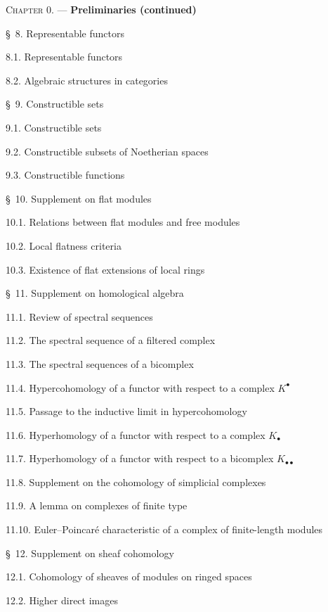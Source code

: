 \documentclass[oneside]{amsart}
\theoremstyle{ega-env-style}
\theoremstyle{ega-thm-env-style}
\theoremstyle{ega-defn-env-style}
\begin{document}
\begin{flushleft}
\textsc{Chapter 0.} --- \textbf{Preliminaries (continued)} 

\medskip
\S~8. Representable functors 

8.1. Representable functors 

8.2. Algebraic structures in categories 

\medskip
\S~9. Constructible sets 

9.1. Constructible sets 

9.2. Constructible subsets of Noetherian spaces 

9.3. Constructible functions 

\medskip
\S~10. Supplement on flat modules 

10.1. Relations between flat modules and free modules 

10.2. Local flatness criteria 

10.3. Existence of flat extensions of local rings 

\medskip
\S~11. Supplement on homological algebra 

11.1. Review of spectral sequences 

11.2. The spectral sequence of a filtered complex 

11.3. The spectral sequences of a bicomplex 

11.4. Hypercohomology of a functor with respect to a complex $K^\bullet$

11.5. Passage to the inductive limit in hypercohomology 

11.6. Hyperhomology of a functor with respect to a complex $K_\bullet$

11.7. Hyperhomology of a functor with respect to a bicomplex
$K_{\bullet\bullet}$ 

11.8. Supplement on the cohomology of simplicial complexes 

11.9. A lemma on complexes of finite type 

11.10. Euler--Poincaré characteristic of a complex of finite-length modules

\medskip
\S~12. Supplement on sheaf cohomology 

12.1. Cohomology of sheaves of modules on ringed spaces 

12.2. Higher direct images 


\end{flushleft}
\end{document}
